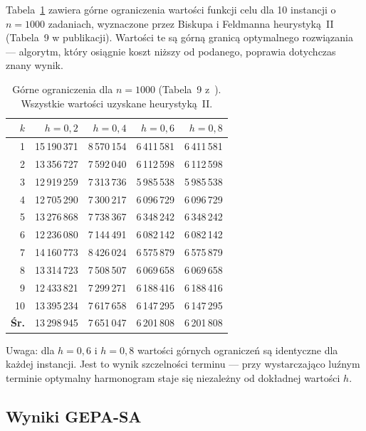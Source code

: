 \documentclass[11pt,a4paper]{article}
\begin{document}
Tabela~\ref{tab:bishop_ub} zawiera górne ograniczenia wartości funkcji celu
dla 10 instancji o $n = 1000$ zadaniach, wyznaczone przez Biskupa i Feldmanna
heurystyką~II~\cite{biskup2001} (Tabela~9 w publikacji).
Wartości te są górną granicą optymalnego rozwiązania — algorytm, który
osiągnie koszt niższy od podanego, poprawia dotychczas znany wynik.

\begin{table}[h]
\centering
\caption{Górne ograniczenia dla $n = 1000$ (Tabela~9 z~\cite{biskup2001}).
         Wszystkie wartości uzyskane heurystyką~II.}
\label{tab:bishop_ub}
\begin{tabular}{@{}rrrrr@{}}
\toprule
$k$ & $h = 0{,}2$ & $h = 0{,}4$ & $h = 0{,}6$ & $h = 0{,}8$ \\
\midrule
 1 & 15\,190\,371 &  8\,570\,154 & 6\,411\,581 & 6\,411\,581 \\
 2 & 13\,356\,727 &  7\,592\,040 & 6\,112\,598 & 6\,112\,598 \\
 3 & 12\,919\,259 &  7\,313\,736 & 5\,985\,538 & 5\,985\,538 \\
 4 & 12\,705\,290 &  7\,300\,217 & 6\,096\,729 & 6\,096\,729 \\
 5 & 13\,276\,868 &  7\,738\,367 & 6\,348\,242 & 6\,348\,242 \\
 6 & 12\,236\,080 &  7\,144\,491 & 6\,082\,142 & 6\,082\,142 \\
 7 & 14\,160\,773 &  8\,426\,024 & 6\,575\,879 & 6\,575\,879 \\
 8 & 13\,314\,723 &  7\,508\,507 & 6\,069\,658 & 6\,069\,658 \\
 9 & 12\,433\,821 &  7\,299\,271 & 6\,188\,416 & 6\,188\,416 \\
10 & 13\,395\,234 &  7\,617\,658 & 6\,147\,295 & 6\,147\,295 \\
\midrule
\textbf{Śr.}
   & 13\,298\,945 &  7\,651\,047 & 6\,201\,808 & 6\,201\,808 \\
\bottomrule
\end{tabular}
\end{table}

Uwaga: dla $h = 0{,}6$ i $h = 0{,}8$ wartości górnych ograniczeń są
identyczne dla każdej instancji.
Jest to wynik szczelności terminu — przy wystarczająco luźnym terminie
optymalny harmonogram staje się niezależny od dokładnej wartości $h$.

\subsection{Wyniki GEPA-SA}
\end{document}

